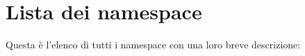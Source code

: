 \section{Lista dei namespace}
Questa è l'elenco di tutti i namespace con una loro breve descrizione\-:\begin{DoxyCompactList}
\item{}
\end{DoxyCompactList}
